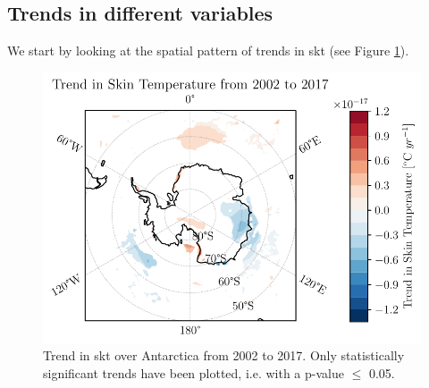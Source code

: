 \documentclass[../main.tex]{subfiles}
\begin{document}
\subsection{Trends in different variables}
We start by looking at the spatial pattern of trends in \gls{skt} (see Figure \ref{fig:trend_skt_02_17}).
\begin{figure}[hbt!]
    \centering
    \includegraphics{images/2021w5/chapter7/hres/trend_spatial_skt}
    \caption{Trend in \gls{skt} over Antarctica from 2002 to 2017. Only statistically significant trends have been plotted, i.e. with a p-value $\leq$ 0.05.}
    \label{fig:trend_skt_02_17}
\end{figure}
\end{document}
